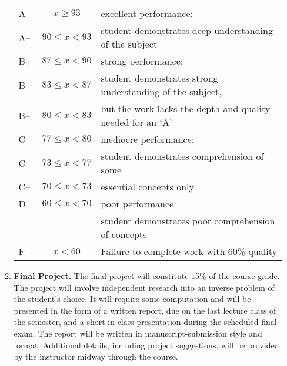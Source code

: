 \documentclass[10pt,titlepage,fleqn]{article}
\begin{document}
\begin{enumerate}
\begin{enumerate}
\begin{tabular}{|l|c|l|}
\hline
A & $x \ge 93$ & excellent performance:  \\
A-- & $90 \le x < 93$ & student demonstrates deep understanding of the subject \\ \hline
B+ & $87 \le x < 90$ & strong performance: \\ 
B  & $83 \le x < 87$ & student demonstrates strong understanding of the subject, \\ 
B-- & $80 \le x < 83$ & but the work lacks the depth and quality needed for an `A' \\ \hline
C+ & $77 \le x < 80$ & mediocre performance: \\
C  & $73 \le x < 77$ & student demonstrates comprehension of some \\
C-- & $70 \le x < 73$ & essential concepts only \\ \hline
D  & $60 \le x < 70$ & poor performance: \\ 
   &                 & student demonstrates poor comprehension of concepts \\ \hline
F  & $x < 60$ & Failure to complete work with 60\% quality \\ \hline
\end{tabular}

\bigskip
\item {\bf Final Project.} The final project will constitute 15\% of the course grade. The project will involve independent research into an inverse problem of the student's choice. It will require some computation and will be presented in the form of a written report, due on the last lecture class of the semester, and a short in-class presentation during the scheduled final exam. The report will be written in manuscript-submission style and format.
Additional details, including project suggestions, will be provided by the instructor midway through the course.


\end{enumerate}


\end{enumerate}
\end{document}
